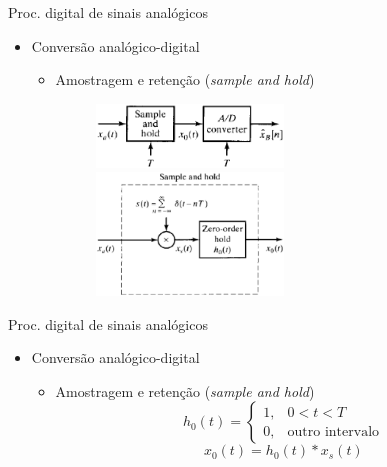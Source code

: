 \begin{slide}{Proc. digital de sinais anal\'ogicos}
\begin{itemize}
   \item Conversão analógico-digital
   \begin{itemize}
      \item Amostragem e retenção (\emph{sample and hold})
      \begin{figure}
         \centering
          \includegraphics[width = 0.5\textwidth]{figs/ad_conv1.eps}
          \includegraphics[width = 0.5\textwidth]{figs/ad_conv2.eps}
      \end{figure}

   \end{itemize}
\end{itemize}
\end{slide}

\begin{slide}{Proc. digital de sinais anal\'ogicos}
\begin{itemize}
   \item Conversão analógico-digital
   \begin{itemize}
      \item Amostragem e retenção (\emph{sample and hold})
      \begin{equation}
          h_0(t) = \begin{cases} 1, & 0<t<T\\0, & \text{outro intervalo}\end{cases}
      \end{equation}
      \begin{equation}
          x_0(t) = h_0(t)\ast x_s(t)
      \end{equation}
   \end{itemize}
\end{itemize}
\end{slide}

